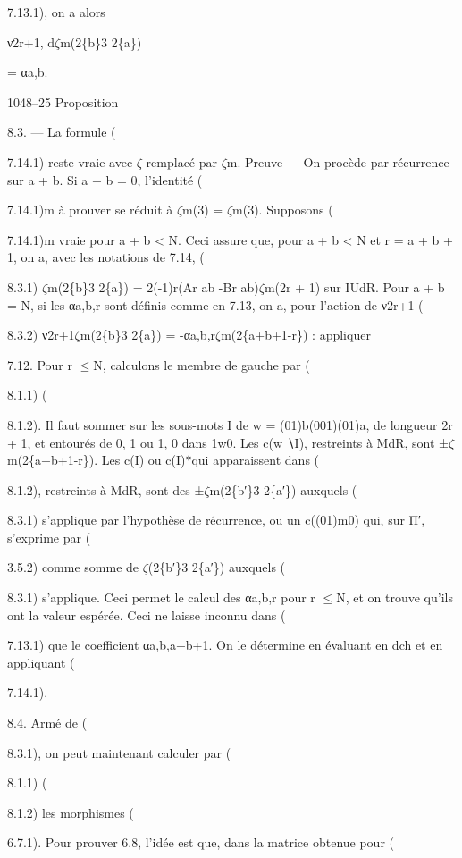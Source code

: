 \documentclass[11pt]{article}
\begin{document}
7.13.1), on a alors

ν2r+1, d\(\zeta\)m(2\{b\}3 2\{a\})

= αa,b.

1048--25 Proposition 

8.3. --- La formule (

7.14.1) reste vraie avec \(\zeta\) remplacé par \(\zeta\)m. Preuve --- On procède par récurrence sur a + b. Si a + b = 0, l’identité (

7.14.1)m à prouver se réduit à \(\zeta\)m(3) = \(\zeta\)m(3). Supposons (

7.14.1)m vraie pour a + b < N. Ceci assure que, pour a + b < N et r = a + b + 1, on a, avec les notations de 7.14, (

8.3.1) \(\zeta\)m(2\{b\}3 2\{a\}) = 2(-1)r(Ar ab -Br ab)\(\zeta\)m(2r + 1) sur IUdR. Pour a + b = N, si les αa,b,r sont définis comme en 7.13, on a, pour l’action de ν2r+1 (

8.3.2) ν2r+1\(\zeta\)m(2\{b\}3 2\{a\}) = -αa,b,r\(\zeta\)m(2\{a+b+1-r\}) : appliquer 

7.12. Pour r \(\le\)N, calculons le membre de gauche par (

8.1.1) (

8.1.2). Il faut sommer sur les sous-mots I de w = (01)b(001)(01)a, de longueur 2r + 1, et entourés de 0, 1 ou 1, 0 dans 1w0. Les c(w ∖I), restreints à MdR, sont ±\(\zeta\)m(2\{a+b+1-r\}). Les c(I) ou c(I)\(*\)qui apparaissent dans (

8.1.2), restreints à MdR, sont des ±\(\zeta\)m(2\{b′\}3 2\{a′\}) auxquels (

8.3.1) s’applique par l’hypothèse de récurrence, ou un c((01)m0) qui, sur Π′, s’exprime par (

3.5.2) comme somme de \(\zeta\)(2\{b′\}3 2\{a′\}) auxquels (

8.3.1) s’applique. Ceci permet le calcul des αa,b,r pour r \(\le\)N, et on trouve qu’ils ont la valeur espérée. Ceci ne laisse inconnu dans (

7.13.1) que le coefficient αa,b,a+b+1. On le détermine en évaluant en dch et en appliquant (

7.14.1). 

8.4. Armé de (

8.3.1), on peut maintenant calculer par (

8.1.1) (

8.1.2) les morphismes (

6.7.1). Pour prouver 6.8, l’idée est que, dans la matrice obtenue pour (
\end{document}
